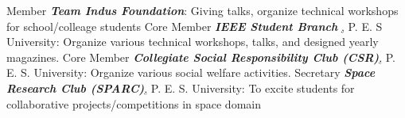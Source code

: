 	\begin{cvskills}
	\cvskill
		{Member}
		{\textit{\textbf{Team Indus Foundation}}: Giving talks, organize technical workshops for school/colleage students}
	\cvskill
		{Core Member}
		{\textit{\textbf{IEEE Student Branch }}\href{http://ieee.pes.edu/}, P. E. S University: Organize various technical workshops, talks, and designed yearly magazines.}
	\cvskill
		{Core Member}
		{\textit{\textbf{Collegiate Social Responsibility Club (CSR)}}\href{http://pes.edu/clubs/pes-csr-club/}, P. E. S. University: Organize various social welfare activities.}
	\cvskill
		{Secretary}
		{\textit{\textbf{Space Research Club (SPARC)}}\href{https://www.facebook.com/Space-Research-Club-Of-PES-University-487153011445398/?tn-str=k*F}, P. E. S. University: To excite students for collaborative projects/competitions in space domain}
\end{cvskills}
